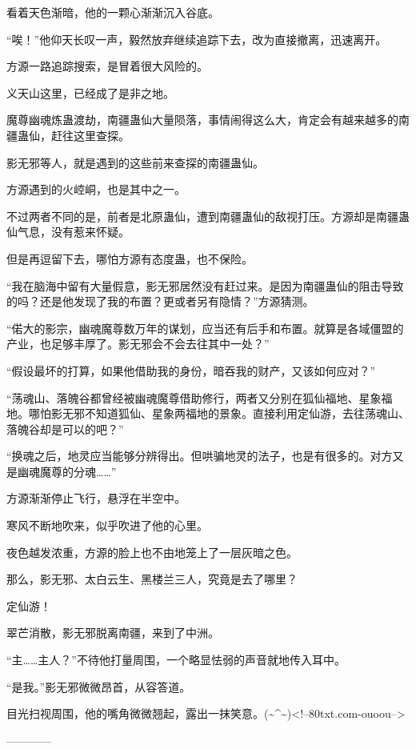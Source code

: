 \begin{this_body}
看着天色渐暗，他的一颗心渐渐沉入谷底。

“唉！”他仰天长叹一声，毅然放弃继续追踪下去，改为直接撤离，迅速离开。

方源一路追踪搜索，是冒着很大风险的。

义天山这里，已经成了是非之地。

魔尊幽魂炼蛊渡劫，南疆蛊仙大量陨落，事情闹得这么大，肯定会有越来越多的南疆蛊仙，赶往这里查探。

影无邪等人，就是遇到的这些前来查探的南疆蛊仙。

方源遇到的火崆峒，也是其中之一。

不过两者不同的是，前者是北原蛊仙，遭到南疆蛊仙的敌视打压。方源却是南疆蛊仙气息，没有惹来怀疑。

但是再逗留下去，哪怕方源有态度蛊，也不保险。

“我在脑海中留有大量假意，影无邪居然没有赶过来。是因为南疆蛊仙的阻击导致的吗？还是他发现了我的布置？更或者另有隐情？”方源猜测。

“偌大的影宗，幽魂魔尊数万年的谋划，应当还有后手和布置。就算是各域僵盟的产业，也足够丰厚了。影无邪会不会去往其中一处？”

“假设最坏的打算，如果他借助我的身份，暗吞我的财产，又该如何应对？”

“荡魂山、落魄谷都曾经被幽魂魔尊借助修行，两者又分别在狐仙福地、星象福地。哪怕影无邪不知道狐仙、星象两福地的景象。直接利用定仙游，去往荡魂山、落魄谷却是可以的吧？”

“换魂之后，地灵应当能够分辨得出。但哄骗地灵的法子，也是有很多的。对方又是幽魂魔尊的分魂……”

方源渐渐停止飞行，悬浮在半空中。

寒风不断地吹来，似乎吹进了他的心里。

夜色越发浓重，方源的脸上也不由地笼上了一层灰暗之色。

那么，影无邪、太白云生、黑楼兰三人，究竟是去了哪里？

定仙游！

翠芒消散，影无邪脱离南疆，来到了中洲。

“主……主人？”不待他打量周围，一个略显怯弱的声音就地传入耳中。

“是我。”影无邪微微昂首，从容答道。

目光扫视周围，他的嘴角微微翘起，露出一抹笑意。(\~{}\^{}\~{})<!--80txt.com-ouoou-->

------------

\end{this_body}


